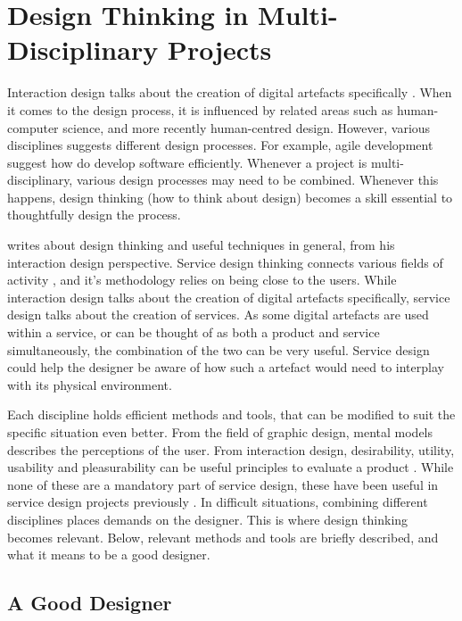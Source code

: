 \section{Design Thinking in Multi-Disciplinary Projects}

%

Interaction design talks about the creation of digital artefacts specifically \citep{lowgren}. When it comes to the design process, it is influenced by related areas such as human-computer science, and more recently human-centred design. However, various disciplines suggests different design processes. For example, agile development suggest how do develop software efficiently. Whenever a project is multi-disciplinary, various design processes may need to be combined. Whenever this happens, design thinking (how to think about design) becomes a skill essential to thoughtfully design the process.

\cite{lowgren} writes about design thinking and useful techniques in general, from his interaction design perspective. Service design thinking connects various fields of activity \citep{stickdorn}, and it's methodology relies on being close to the users. While interaction design talks about the creation of digital artefacts specifically, service design talks about the creation of services. As some digital artefacts are used within a service, or can be thought of as both a product and service simultaneously, the combination of the two can be very useful. Service design could help the designer be aware of how such a artefact would need to interplay with its physical environment.

Each discipline holds efficient methods and tools, that can be modified to suit the specific situation even better. From the field of graphic design, mental models describes the perceptions of the user. From interaction design, desirability, utility, usability and pleasurability can be useful principles to evaluate a product \citep{clatworthy}. While none of these are a mandatory part of service design, these have been useful in service design projects previously \citep{stickdorn}. In difficult situations, combining different disciplines places demands on the designer. This is where design thinking becomes relevant. Below, relevant methods and tools are briefly described, and what it means to be a good designer.

\subsection{A Good Designer}\label{aGoodDesigner}

